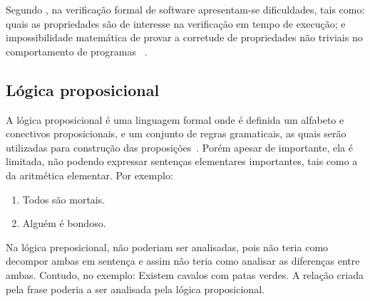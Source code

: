 Segundo \citeauthor{rocha2015verificaccao}, na verificação formal de software apresentam-se dificuldades, tais como: quais as propriedades são de interesse na verificação em tempo de execução; e impossibilidade matemática de provar a corretude de propriedades não triviais no comportamento de programas 
~\cite{cousot2010gentle}. 

\subsection{Lógica proposicional}

A lógica proposicional é uma linguagem formal onde é definida um alfabeto e conectivos proposicionais, e um conjunto de regras gramaticais, as quais serão utilizadas para construção das proposições~\cite{souza2017logica}. Porém apesar de importante, ela é limitada, não podendo expressar sentenças elementares importantes, tais como a da aritmética elementar. Por exemplo:
\begin{enumerate}
\item Todos são mortais.
\item Alguém é bondoso.
\end{enumerate}

Na lógica preposicional, não poderiam ser analisadas, pois não teria como decompor ambas em sentença e assim não teria como analisar as diferenças entre ambas\cite{abe2002introducao}. Contudo, no exemplo:
% 
Existem cavalos com patas verdes. 
% 
A relação criada pela frase poderia a ser analisada pela lógica proposicional\cite{abe2002introducao}.


